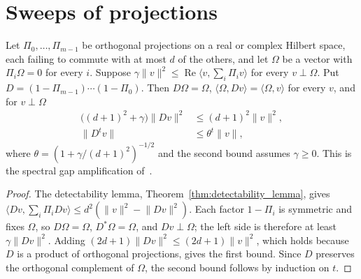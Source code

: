 \section{Sweeps of projections}
\label{sec:martingale_sweep}

\begin{theorem}
    \label{thm:martingale_sweep_contraction}
    \leanok
    Let $\Pi_0,\dots,\Pi_{m-1}$ be orthogonal projections on a real or complex Hilbert
    space, each failing to commute with at most $d$ of the others, and let $\Omega$ be a
    vector with $\Pi_i\Omega=0$ for every $i$. Suppose
    $\gamma\lVert v\rVert^2\le\operatorname{Re}\langle v,\sum_i\Pi_iv\rangle$ for every
    $v\perp\Omega$. Put $D=(1-\Pi_{m-1})\cdots(1-\Pi_0)$. Then $D\Omega=\Omega$,
    $\langle\Omega,Dv\rangle=\langle\Omega,v\rangle$ for every $v$, and for $v\perp\Omega$
    \begin{align*}
        \bigl((d+1)^2+\gamma\bigr)\lVert Dv\rVert^2 & \le(d+1)^2\lVert v\rVert^2, \\
        \lVert D^tv\rVert                           & \le\theta^t\lVert v\rVert,
    \end{align*}
    where $\theta=(1+\gamma/(d+1)^2)^{-1/2}$ and the second bound assumes $\gamma\ge0$.
    This is the spectral gap amplification of~\cite{Anshu2016Simple}.
\end{theorem}
\begin{proof}\leanok
    The detectability lemma, Theorem~\ref{thm:detectability_lemma}, gives
    $\langle Dv,\sum_i\Pi_iDv\rangle\le d^2(\lVert v\rVert^2-\lVert Dv\rVert^2)$. Each
    factor $1-\Pi_i$ is symmetric and fixes $\Omega$, so $D\Omega=\Omega$, $D^*\Omega=
        \Omega$, and $Dv\perp\Omega$; the left side is therefore at least
    $\gamma\lVert Dv\rVert^2$. Adding $(2d+1)\lVert Dv\rVert^2\le(2d+1)\lVert v\rVert^2$,
    which holds because $D$ is a product of orthogonal projections, gives the first
    bound. Since $D$ preserves the orthogonal complement of $\Omega$, the second bound
    follows by induction on $t$.
\end{proof}

